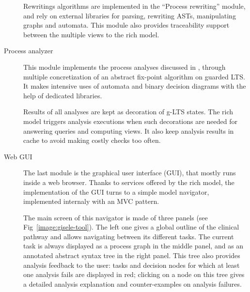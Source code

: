 \begin{description}
Rewritings algorithms are implemented in the ``Process rewriting'' module, and rely on external libraries for parsing, rewriting ASTs, manipulating graphs and automata. This module also provides traceability support between the multiple views to the rich model.

\item[Process analyzer] This module implements the process analyses discussed in \cite{Damas:2011}, through multiple concretization of an abstract fix-point algorithm on guarded LTS. It makes intensive uses of automata and binary decision diagrams with the help of dedicated libraries. 

Results of all analyses are kept as decoration of g-LTS states. The rich model triggers analysis executions when such decorations are needed for answering queries and computing views. It also keep analysis results in cache to avoid making costly checks too often.

\item[Web GUI] The last module is the graphical user interface (GUI), that mostly runs inside a web browser. Thanks to services offered by the rich model, the implementation of the GUI turns to a simple model navigator, implemented internaly with an MVC pattern. 

The main screen of this navigator is made of three panels (see Fig~\ref{image:gisele-tool}). The left one gives a global outline of the clinical pathway and allows navigating between its different tasks. The current task is always displayed as a process graph in the middle panel, and as an annotated abstract syntax tree in the right panel. This tree also provides analysis feedback to the user: tasks and decision nodes for which at least one analysis fails are displayed in red; clicking on a node on this tree gives a detailed analysis explanation and counter-examples on analysis failures.

\end{description}



